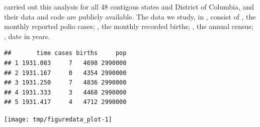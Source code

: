 \begin{frame}[fragile]

\bi
\item \citet{Martinez-Bakker2015} carried out this analysis for all 48 contigous states and District of Columbia, and their data and code are publicly available. The data we study, in , consist of , the monthly reported polio cases; , the  monthly recorded births; , the annual census; , date in years.
\ei

\begin{knitrout}\small
{}\color{fgcolor}\begin{kframe}
\begin{alltt}
 \hlkwb{<-} \hlstd{(}\hlstd{,}\hlstd{=}\hlstd{)}
\hlstd{)}
\end{alltt}
\begin{verbatim}
##       time cases births     pop
## 1 1931.083     7   4698 2990000
## 2 1931.167     0   4354 2990000
## 3 1931.250     7   4836 2990000
## 4 1931.333     3   4468 2990000
## 5 1931.417     4   4712 2990000
\end{verbatim}
\end{kframe}
\end{knitrout}

\end{frame}

\begin{frame}[fragile]

\begin{knitrout}\small
{}\color{fgcolor}

{\centering \texttt{[image: tmp/figuredata\_plot-1]} 

}



\end{knitrout}


\end{frame}

